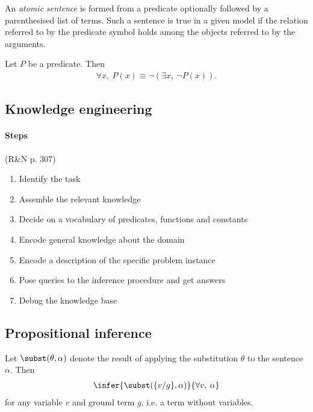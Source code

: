 \documentclass{article}
\begin{document}
\begin{definition}[R\&N p. 293]
    An \emph{atomic sentence} is formed from a predicate optionally followed
    by a parenthesised list of terms. Such a sentence is true in a given model
    if the relation referred to by the predicate symbol holds among the objects
    referred to by the arguments.
\end{definition}

\begin{theorem}[R\&N p. 298]
    Let $P$ be a predicate. Then
    \begin{align*}
        \forall x,\: P(x) \equiv \neg(\exists x,\: \neg P(x)).
    \end{align*}
\end{theorem}

\subsection{Knowledge engineering}

\paragraph{Steps}(R\&N p. 307)
\begin{enumerate}
    \item Identify the task 
    \item Assemble the relevant knowledge
    \item Decide on a vocabulary of predicates, functions and constants
    \item Encode general knowledge about the domain
    \item Encode a description of the specific problem instance
    \item Pose queries to the inference procedure and get answers
    \item Debug the knowledge base
\end{enumerate}

\subsection{Propositional inference}

\begin{theorem}
    Let $\subst(\theta, \alpha)$ denote the result of applying
    the substitution $\theta$ to the sentence $\alpha$. Then
    \begin{align*}
        \infer{\subst(\{v/g\},\alpha)}{\forall v,\:\alpha}
    \end{align*}
    for any variable $v$ and ground term $g$, i.e. a term without variables.
\end{theorem}
\end{document}
